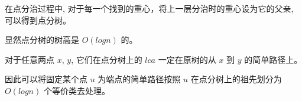 在点分治过程中, 对于每一个找到的重心，将上一层分治时的重心设为它的父亲, 可以得到点分树。

显然点分树的树高是 $O(logn)$ 的。

对于任意两点 $x$, $y$, 它们在点分树上的 $lca$ 一定在原树的从 $x$ 到 $y$ 的简单路径上。

因此可以将固定某个点 $u$ 为端点的简单路径按照 $u$ 在点分树上的祖先划分为 $O(logn)$ 个等价类去处理。